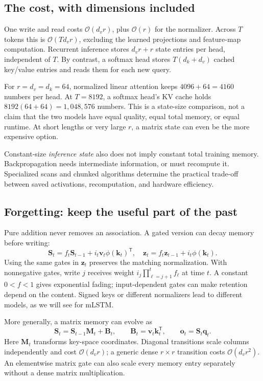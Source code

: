 \documentclass[11pt, oneside]{book}
\newcommand{\T}{^{\mathsf{T}}}           %
\newcommand{\bigO}[1]{\mathcal{O}\!\left(#1\right)}
\let\originalsubsection\subsection
\renewcommand{\subsection}{\Needspace{6\baselineskip}\originalsubsection}
\begin{document}
\subsection*{The cost, with dimensions included}
One write and read costs $\bigO{d_vr}$, plus $\bigO{r}$ for the normalizer. Across $T$ tokens this is $\bigO{Td_vr}$, excluding the learned projections and feature-map computation. Recurrent inference stores $d_vr+r$ state entries per head, independent of $T$. By contrast, a softmax head stores $T(d_k+d_v)$ cached key/value entries and reads them for each new query.

For $r=d_v=d_k=64$, normalized linear attention keeps $4096+64=4160$ numbers per head. At $T=8192$, a softmax head's KV cache holds $8192(64+64)=1{,}048{,}576$ numbers. This is a state-size comparison, not a claim that the two models have equal quality, equal total memory, or equal runtime. At short lengths or very large $r$, a matrix state can even be the more expensive option.

Constant-size \emph{inference state} also does not imply constant total training memory. Backpropagation needs intermediate information, or must recompute it. Specialized scans and chunked algorithms determine the practical trade-off between saved activations, recomputation, and hardware efficiency.

\subsection*{Forgetting: keep the useful part of the past}
Pure addition never removes an association. A gated version can decay memory before writing:
\[
 \mathbf{S}_t=f_t\mathbf{S}_{t-1}+i_t\mathbf{v}_t\phi(\mathbf{k}_t)\T,
 \quad
 \mathbf{z}_t=f_t\mathbf{z}_{t-1}+i_t\phi(\mathbf{k}_t).
\]
Using the same gates in $\mathbf{z}_t$ preserves the matching normalization. With nonnegative gates, write $j$ receives weight $i_j\prod_{\ell=j+1}^t f_\ell$ at time $t$. A constant $0<f<1$ gives exponential fading; input-dependent gates can make retention depend on the content. Signed keys or different normalizers lead to different models, as we will see for mLSTM.

More generally, a matrix memory can evolve as
\[
 \mathbf{S}_t=\mathbf{S}_{t-1}\mathbf{M}_t+\mathbf{B}_t,
 \qquad \mathbf{B}_t=\mathbf{v}_t\mathbf{k}_t\T,
 \qquad \mathbf{o}_t=\mathbf{S}_t\mathbf{q}_t.
\]
Here $\mathbf{M}_t$ transforms key-space coordinates. Diagonal transitions scale columns independently and cost $\bigO{d_vr}$; a generic dense $r\times r$ transition costs $\bigO{d_vr^2}$. An elementwise matrix gate can also scale every memory entry separately without a dense matrix multiplication.
\end{document}
